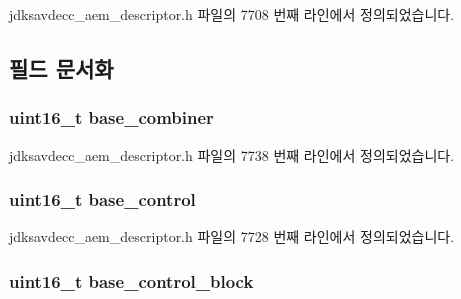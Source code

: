 jdksavdecc\+\_\+aem\+\_\+descriptor.\+h 파일의 7708 번째 라인에서 정의되었습니다.



\subsection{필드 문서화}
\subsubsection[{\texorpdfstring{base\+\_\+combiner}{base_combiner}}]{\setlength{\rightskip}{0pt plus 5cm}uint16\+\_\+t base\+\_\+combiner}\hypertarget{structjdksavdecc__descriptor__audio__unit_afeae9980c36b3e99f2e4b8ab2c31e9d5}{}\label{structjdksavdecc__descriptor__audio__unit_afeae9980c36b3e99f2e4b8ab2c31e9d5}


jdksavdecc\+\_\+aem\+\_\+descriptor.\+h 파일의 7738 번째 라인에서 정의되었습니다.

\subsubsection[{\texorpdfstring{base\+\_\+control}{base_control}}]{\setlength{\rightskip}{0pt plus 5cm}uint16\+\_\+t base\+\_\+control}\hypertarget{structjdksavdecc__descriptor__audio__unit_af06eac7dd98377a85258308e8a25e7f2}{}\label{structjdksavdecc__descriptor__audio__unit_af06eac7dd98377a85258308e8a25e7f2}


jdksavdecc\+\_\+aem\+\_\+descriptor.\+h 파일의 7728 번째 라인에서 정의되었습니다.

\subsubsection[{\texorpdfstring{base\+\_\+control\+\_\+block}{base_control_block}}]{\setlength{\rightskip}{0pt plus 5cm}uint16\+\_\+t base\+\_\+control\+\_\+block}\hypertarget{structjdksavdecc__descriptor__audio__unit_a9303491ec92ba42c28fb904c14d310b0}{}\label{structjdksavdecc__descriptor__audio__unit_a9303491ec92ba42c28fb904c14d310b0}


